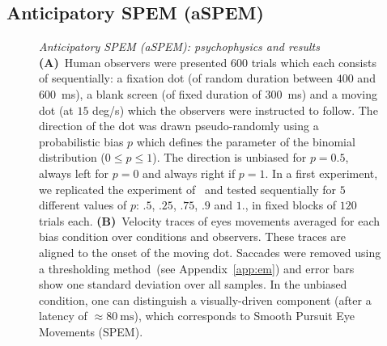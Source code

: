 \documentclass[profile,final,english, draft]{article}%
\newcommand{\ms}{\si{\milli\second}}%
\newcommand{\citep}[1]{\parencite{#1}}
\newcommand{\seeApp}[1]{see Appendix~\ref{app:#1}}
\begin{document}
\subsection{Anticipatory SPEM (aSPEM)}
\begin{figure}%
\caption{\emph{Anticipatory SPEM (aSPEM): psychophysics and results} %
\textbf{(A)}~Human observers were presented $600$ trials %
which each consists of sequentially:
a fixation dot (of random duration between $400$ and $600$~\ms),
a blank screen (of fixed duration of  $300$~\ms) and
a moving dot (at $15$ deg/s) which the observers were instructed to follow.
The direction of the dot was drawn pseudo-randomly
using a probabilistic bias $p$ which defines the parameter
of the binomial distribution
($0\leq p\leq 1 $). The direction is unbiased for $p=0.5$,
always left for $p=0$ and always right if $p=1$.
In a first experiment,
we replicated the experiment of~\citep{Montagnini2010} and
tested sequentially for $5$ different values of $p$:
$.5$, $.25$, $.75$, $.9$ and $1.$,  
in fixed blocks of $120$ trials each.
\textbf{(B)}~Velocity traces of eyes movements 
averaged for each bias condition
over conditions and observers.
These traces are aligned to the onset of the moving dot.
Saccades were removed using a thresholding method~(\seeApp{em}) and
error bars show one standard deviation over all samples.
In the unbiased condition, one can distinguish
a visually-driven component (after a latency of $\approx 80~\ms$),
which corresponds to Smooth Pursuit Eye Movements (SPEM).
}
\end{figure}
\end{document}
